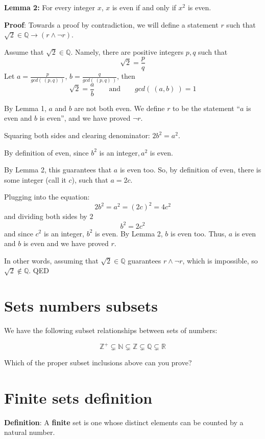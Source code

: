 \documentclass[12pt, oneside]{article}
\begin{document}
{\bf Lemma 2:} For every integer  $x$, $x$ is  even if and only if $x^2$  is even.


{\bf Proof}: Towards a proof by contradiction, we will define a statement 
$r$ such that $\sqrt{2} \in \mathbb{Q} \to (r \land \lnot r)$. 

Assume that $\sqrt{2} \in \mathbb{Q}$. Namely, there are positive integers
$p, q$ such that 
\[
    \sqrt{2} = \frac{p}{q}
\]
Let $a= \frac{p}{gcd( ~(p,q)~)}$, $b = \frac{q}{gcd(~(p,q)~)}$, then 
\[
    \sqrt{2} = \frac{a}{b} \qquad \text{and} \qquad gcd(~(a,b)~) = 1
\]

By Lemma 1, $a$ and $b$ are not both even. We define $r$ to be the 
statement ``$a$ is even and $b$ is even'', and we have proved $\lnot r$.

Squaring both sides and clearing denominator: $2b^2 = a^2$.

By definition of even, since $b^2$ is an integer$, a^2$ is even.

By Lemma 2, this guarantees that $a$ is even too. So, by 
definition of even, there is some integer (call it $c$), such that $a = 2c$.

Plugging into the equation:
\[
    2b^2 = a^2 = (2c)^2 = 4c^2
\]
and dividing both sides by $2$
\[
    b^2 = 2c^2
\]
and since $c^2$ is an integer, $b^2$ is even. By Lemma 2, $b$ is even too.
Thus, $a$ is even and $b$ is even and we have proved $r$. 

In other words, assuming that $\sqrt{2} \in \mathbb{Q}$ guarantees $r \land \lnot r$, 
which is impossible, so $\sqrt{2} \notin \mathbb{Q}$. QED

 \vfill
\section*{Sets numbers subsets}


We have the following subset relationships between sets of numbers:

\[
    \mathbb{Z}^{+} \subsetneq \mathbb{N} \subsetneq \mathbb{Z} \subsetneq \mathbb{Q} \subsetneq \mathbb{R}
\]


Which of the proper subset inclusions above can you prove?

\vspace{50pt} \vfill
\section*{Finite sets definition}


{\bf Definition}: A {\bf finite} set is one whose distinct elements can be counted by a natural number.
 \vfill
\end{document}
